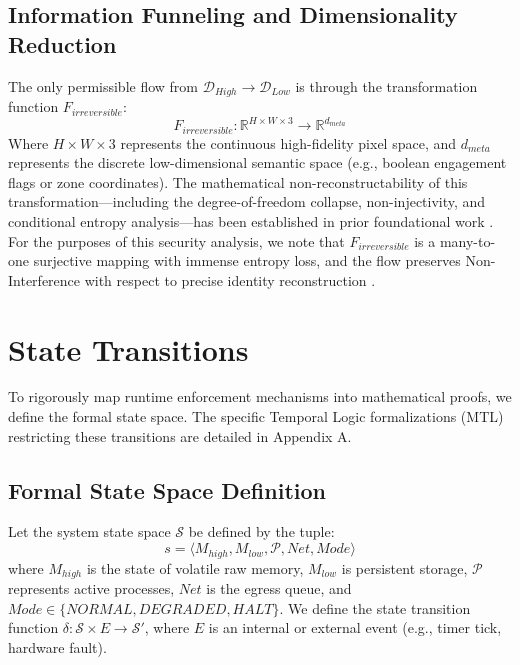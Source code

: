 \documentclass[conference]{IEEEtran}
\begin{document}
\subsection{Information Funneling and Dimensionality Reduction}
The only permissible flow from $\mathcal{D}_{High} \to \mathcal{D}_{Low}$ is through the transformation function $F_{irreversible}$:
\begin{equation}
F_{irreversible}: \mathbb{R}^{H \times W \times 3} \to \mathbb{R}^{d_{meta}}
\end{equation}
Where $H \times W \times 3$ represents the continuous high-fidelity pixel space, and $d_{meta}$ represents the discrete low-dimensional semantic space (e.g., boolean engagement flags or zone coordinates). The mathematical non-reconstructability of this transformation---including the degree-of-freedom collapse, non-injectivity, and conditional entropy analysis---has been established in prior foundational work \cite{b8, b11}. For the purposes of this security analysis, we note that $F_{irreversible}$ is a many-to-one surjective mapping with immense entropy loss, and the flow preserves Non-Interference with respect to precise identity reconstruction \cite{b23}.

\section{State Transitions}
To rigorously map runtime enforcement mechanisms into mathematical proofs, we define the formal state space. The specific Temporal Logic formalizations (MTL) restricting these transitions are detailed in Appendix A.

\subsection{Formal State Space Definition}
Let the system state space $\mathcal{S}$ be defined by the tuple:
\begin{equation}
s = \langle M_{high}, M_{low}, \mathcal{P}, Net, Mode \rangle
\end{equation}
where $M_{high}$ is the state of volatile raw memory, $M_{low}$ is persistent storage, $\mathcal{P}$ represents active processes, $Net$ is the egress queue, and $Mode \in \{NORMAL, DEGRADED, HALT\}$. 
We define the state transition function $\delta : \mathcal{S} \times E \to \mathcal{S}'$, where $E$ is an internal or external event (e.g., timer tick, hardware fault). 
\end{document}
